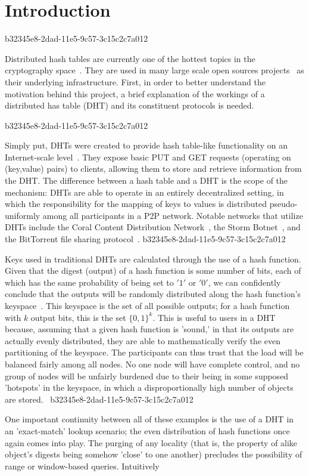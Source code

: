 \documentclass[12pt]{article}
\begin{document}
\section{Introduction}
b32345e8-2dad-11e5-9c57-3c15c2c7a012\par Distributed hash tables are currently one of the hottest topics in the cryptography space~\cite{Stoica:2001dj,Rowstron:2001ea,Ratnasamy:2001wn}. They are used in many large scale open sources projects~\cite{Freitas:2013tb,Xu:2010vs,Perfitt:2010fh} as their underlying infrastructure. First, in order to better understand the motivation behind this project, a brief explanation of the workings of a distributed has table (DHT) and its constituent protocols is needed.

b32345e8-2dad-11e5-9c57-3c15c2c7a012\par Simply put, DHTs were created to provide hash table-like functionality on an Internet-scale level~\cite{Ratnasamy:2001wn}. They expose basic PUT and GET requests (operating on (key,value) pairs) to clients, allowing them to store and retrieve information from the DHT. The difference between a hash table and a DHT is the scope of the mechanism: DHTs are able to operate in an entirely decentralized setting, in which the responsibility for the mapping of keys to values is distributed pseudo-uniformly among all participants in a P2P network. Notable networks that utilize DHTs include the Coral Content Distribution Network~\cite{Freedman:2004vb}, the Storm Botnet~\cite{Holz:2008uk}, and the BitTorrent file sharing protocol~\cite{Cohen:y1_8mBnw}.
b32345e8-2dad-11e5-9c57-3c15c2c7a012
\par Keys used in traditional DHTs are calculated through the use of a hash function. Given that the digest (output) of a hash function is some number of bits, each of which has the same probability of being set to $'1'$ or $'0'$, we can confidently conclude that the outputs will be randomly distributed along the hash function's keyspace~. This keyspace is the set of all possible outputs; for a hash function with $k$ output bits, this is the set $\{0,1\}^k$. This is useful to users in a DHT because, assuming that a given hash function is 'sound,' in that its outputs are actually evenly distributed, they are able to mathematically verify the even partitioning of the keyspace. The participants can thus trust that the load will be balanced fairly among all nodes. No one node will have complete control, and no group of nodes will be unfairly burdened due to their being in some supposed 'hotspots' in the keyspace, in which a disproportionally high number of objects are stored.~
b32345e8-2dad-11e5-9c57-3c15c2c7a012
\par One important continuity between all of these examples is the use of a DHT in an 'exact-match' lookup scenario; the even distribution of hash functions once again comes into play. The purging of any locality (that is, the property of alike object's digests being somehow 'close' to one another) precludes the possibility of range or window-based queries. Intuitively
\end{document}
